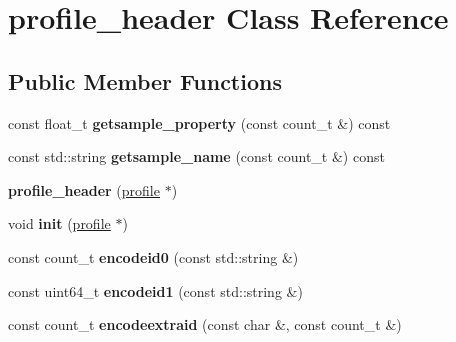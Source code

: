 \hypertarget{classprofile__header}{\section{profile\-\_\-header Class Reference}
\label{classprofile__header}
}
\subsection*{Public Member Functions}
\begin{DoxyCompactItemize}
\item 
\hypertarget{classprofile__header_aa666e5c8637ce8191b438d4cd0112cde}{const float\-\_\-t {\bfseries getsample\-\_\-property} (const count\-\_\-t \&) const }\label{classprofile__header_aa666e5c8637ce8191b438d4cd0112cde}

\item 
\hypertarget{classprofile__header_a201dbada841c37df4d9981826a4e9f9e}{const std\-::string {\bfseries getsample\-\_\-name} (const count\-\_\-t \&) const }\label{classprofile__header_a201dbada841c37df4d9981826a4e9f9e}

\item 
\hypertarget{classprofile__header_aa4fb665d7db7ecb1ac44a14d6a387cc3}{{\bfseries profile\-\_\-header} (\hyperlink{classprofile}{profile} $\ast$)}\label{classprofile__header_aa4fb665d7db7ecb1ac44a14d6a387cc3}

\item 
\hypertarget{classprofile__header_a378de68d739e5a923f53dca9431ee597}{void {\bfseries init} (\hyperlink{classprofile}{profile} $\ast$)}\label{classprofile__header_a378de68d739e5a923f53dca9431ee597}

\item 
\hypertarget{classprofile__header_aecfb09996a8691599df7304f35108d93}{const count\-\_\-t {\bfseries encodeid0} (const std\-::string \&)}\label{classprofile__header_aecfb09996a8691599df7304f35108d93}

\item 
\hypertarget{classprofile__header_a278132f14b2f4ec681439eadab7b5622}{const uint64\-\_\-t {\bfseries encodeid1} (const std\-::string \&)}\label{classprofile__header_a278132f14b2f4ec681439eadab7b5622}

\item 
\hypertarget{classprofile__header_ab98532b63dee3c99a8a66465d45e59ec}{const count\-\_\-t {\bfseries encodeextraid} (const char \&, const count\-\_\-t \&)}\label{classprofile__header_ab98532b63dee3c99a8a66465d45e59ec}


\end{DoxyCompactItemize}

